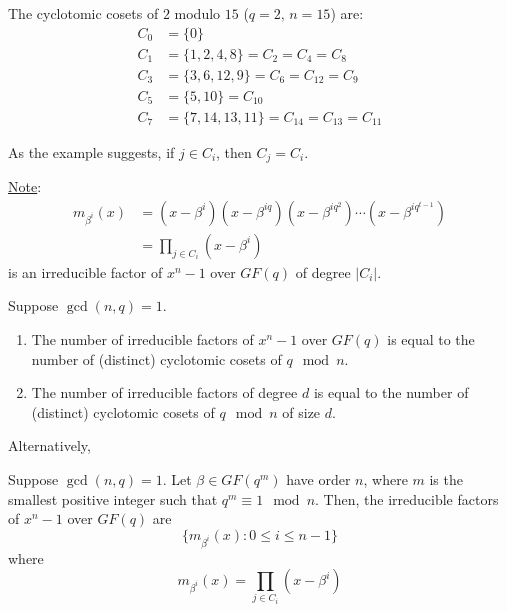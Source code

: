 \begin{exbox}
    \begin{example}
        The cyclotomic cosets of $ 2 $ modulo $ 15 $ ($ q=2,\,n=15 $) are:
        \begin{align*}
            C_0 & =\{0\}                               \\
            C_1 & =\{1,2,4,8\}=C_2=C_4=C_8             \\
            C_3 & =\{3,6,12,9\}=C_6=C_{12}=C_9         \\
            C_5 & =\{5,10\}=C_{10}                     \\
            C_7 & =\{7,14,13,11\}=C_{14}=C_{13}=C_{11}
        \end{align*}
    \end{example}
\end{exbox}
As the example suggests, if $ j\in C_i $, then $ C_j=C_i $.

\underline{Note}:
\begin{align*}
    m_{\beta^i}(x)
     & =(x-\beta^i)(x-\beta^{iq})(x-\beta^{iq^2})\cdots(x-\beta^{iq^{t-1}}) \\
     & =\prod_{j\in C_i}(x-\beta^i)
\end{align*}
is an irreducible factor of $ x^n-1 $ over $ GF(q) $ of degree $ |C_i| $.

\begin{thmbox}
    \begin{theorem}
        Suppose $ \gcd(n,q)=1 $.
        \begin{enumerate}[label=(\roman*)]
            \item The number of irreducible factors of $ x^n-1 $
                  over $ GF(q) $ is equal to the number of (distinct)
                  cyclotomic cosets of $ q\mod n $.
            \item The number of irreducible factors of degree $ d $
                  is equal to the number of (distinct)
                  cyclotomic cosets of $ q\mod n $ of size $ d $.
        \end{enumerate}
    \end{theorem}
\end{thmbox}

Alternatively,
\begin{thmbox}
    \begin{theorem}
        Suppose $ \gcd(n,q)=1 $. Let $ \beta\in GF(q^m) $ have order
        $ n $, where $ m $ is the smallest positive integer such that
        $ q^m\equiv 1\mod n $. Then, the irreducible factors of $ x^n-1 $
        over $ GF(q) $ are
        \[ \{m_{\beta^i}(x):0\leqslant i\leqslant n-1\} \]
        where
        \[ m_{\beta^i}(x)=\prod_{j\in C_i}(x-\beta^i) \]
    \end{theorem}
\end{thmbox}

